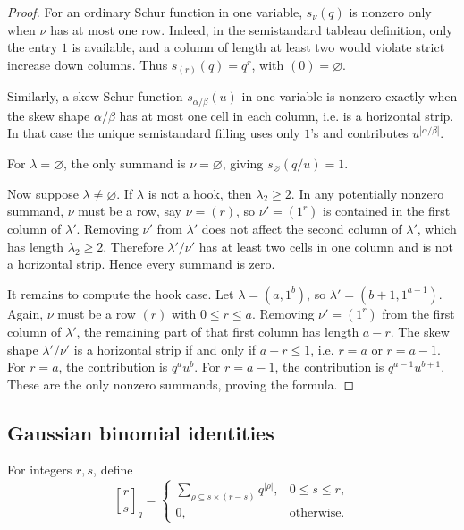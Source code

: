 \documentclass[12pt]{article}
\newcommand{\qbinom}[2]{\genfrac{[}{]}{0pt}{}{#1}{#2}_q}
\begin{document}
\begin{proof}
For an ordinary Schur function in one variable, \(s_\nu(q)\) is nonzero only when \(\nu\) has at most one row.  Indeed, in the semistandard tableau definition, only the entry \(1\) is available, and a column of length at least two would violate strict increase down columns.  Thus \(s_{(r)}(q)=q^r\), with \((0)=\varnothing\).

Similarly, a skew Schur function \(s_{\alpha/\beta}(u)\) in one variable is nonzero exactly when the skew shape \(\alpha/\beta\) has at most one cell in each column, i.e. is a horizontal strip.  In that case the unique semistandard filling uses only \(1\)'s and contributes \(u^{|\alpha/\beta|}\).

For \(\lambda=\varnothing\), the only summand is \(\nu=\varnothing\), giving \(s_{\varnothing}(q/u)=1\).

Now suppose \(\lambda\neq\varnothing\).  If \(\lambda\) is not a hook, then \(\lambda_2\ge 2\).  In any potentially nonzero summand, \(\nu\) must be a row, say \(\nu=(r)\), so \(\nu'=(1^r)\) is contained in the first column of \(\lambda'\).  Removing \(\nu'\) from \(\lambda'\) does not affect the second column of \(\lambda'\), which has length \(\lambda_2\ge 2\).  Therefore \(\lambda'/\nu'\) has at least two cells in one column and is not a horizontal strip.  Hence every summand is zero.

It remains to compute the hook case.  Let \(\lambda=(a,1^b)\), so \(\lambda'=(b+1,1^{a-1})\).  Again, \(\nu\) must be a row \((r)\) with \(0\le r\le a\).  Removing \(\nu'=(1^r)\) from the first column of \(\lambda'\), the remaining part of that first column has length \(a-r\).  The skew shape \(\lambda'/\nu'\) is a horizontal strip if and only if \(a-r\le 1\), i.e. \(r=a\) or \(r=a-1\).  For \(r=a\), the contribution is \(q^a u^b\).  For \(r=a-1\), the contribution is \(q^{a-1}u^{b+1}\).  These are the only nonzero summands, proving the formula.
\end{proof}

\subsection{Gaussian binomial identities}

For integers \(r,s\), define
\[
\qbinom{r}{s}
=
\begin{cases}
\displaystyle \sum_{\rho\subseteq s\times(r-s)}q^{|\rho|},
& 0\le s\le r,\\[1em]
0,
&\text{otherwise.}
\end{cases}
\]
\end{document}
